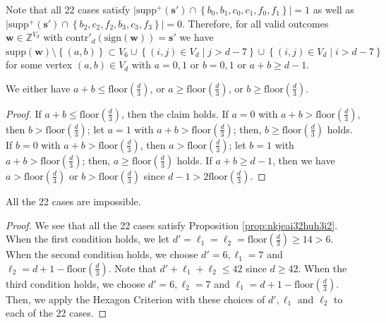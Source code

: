 Note that all 22 cases satisfy \( \lvert \mathrm{supp}^+(\mathbf{s}') \cap \left\{b_0, b_1, c_0, c_1, f_0, f_1 \right\} \rvert = 1 \) as well as \( \lvert \mathrm{supp}^+(\mathbf{s}') \cap \left\{b_2, c_2, f_2, b_3, c_3, f_3 \right\} \rvert = 0 \).
Therefore, for all valid outcomes \( \mathbf{w} \in \mathbb{Z}^{V_d} \) with \( \mathrm{contr}'_d(\mathrm{sign}(\mathbf{w})) = \mathbf{s}' \) we have \( \mathrm{supp}(\mathbf{w}) \setminus \left\{ (a,b) \right\} \subset V_6 \cup \left\{ (i,j) \in V_d \mid j > d - 7 \right\}  \cup \left\{ (i,j) \in V_d \mid i > d - 7 \right\}  \)
for some vertex \( (a,b) \in V_d \) with \( a = 0,1 \) or \( b=0,1 \) or \( a + b \geq d-1 \).

\begin{proposition}\label{prop:nkjeai32huh3i2}
    We either have  \( a + b \leq \mathrm{floor}(\frac{d}{3}) \), or \( a \geq \mathrm{floor}(\frac{d}{3}) \), or \( b \geq \mathrm{floor}(\frac{d}{3}) \).
\end{proposition}

\begin{proof}
    If \( a + b \leq \mathrm{floor}(\frac{d}{3}) \), then the claim holds. If \( a = 0 \) with \( a + b > \mathrm{floor}(\frac{d}{3}) \), then \( b > \mathrm{floor}(\frac{d}{3}) \); let \( a = 1 \) with \( a + b > \mathrm{floor}(\frac{d}{3}) \); then, \( b \geq \mathrm{floor}(\frac{d}{3}) \) holds. If \( b = 0 \) with \( a + b > \mathrm{floor}(\frac{d}{3}) \), then \( a > \mathrm{floor}(\frac{d}{3}) \); let \( b = 1 \) with \( a + b > \mathrm{floor}(\frac{d}{3}) \); then, \( a \geq \mathrm{floor}(\frac{d}{3}) \) holds. If \( a + b \geq d-1  \), then we have \( a > \mathrm{floor}(\frac{d}{3}) \) or \( b > \mathrm{floor}(\frac{d}{3}) \) since \( d-1 > 2 \mathrm{floor}(\frac{d}{3}) \).
\end{proof}

\begin{proposition}
    All the 22 cases are impossible.
\end{proposition}

\begin{proof}
    We see that all the 22 cases satisfy Proposition \ref{prop:nkjeai32huh3i2}. When the first condition holds, we let \( d' = \ell_1 = \ell_2 = \mathrm{floor}(\frac{d}{3}) \geq 14 > 6 \). When the second condition holds, we choose \( d' = 6, \ell_1 = 7 \) and \( \ell_2 = d + 1 - \mathrm{floor}(\frac{d}{3}) \). Note that \( d' + \ell_1 + \ell_2 \leq 42 \) since \( d \geq 42 \). When the third condition holds, we choose  \( d' = 6, \ell_2 = 7 \) and \( \ell_1 = d + 1 - \mathrm{floor}(\frac{d}{3}) \). Then, we apply the Hexagon Criterion with these choices of \( d', \ell_1 \) and \( \ell_2 \) to each of the 22 cases.
\end{proof}


